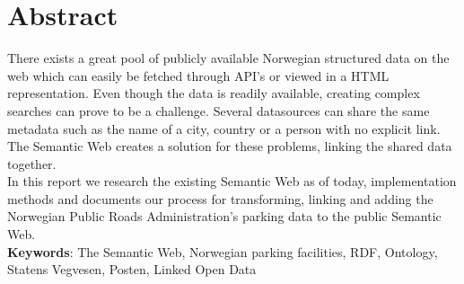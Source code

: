\chapter*{Abstract}
There exists a great pool of publicly available Norwegian structured data on the web which can easily be fetched through API's or viewed in a HTML representation. Even though the data is readily available, creating complex searches can prove to be a challenge. Several datasources can share the same metadata such as the name of a city, country or a person with no explicit link. The Semantic Web creates a solution for these problems, linking the shared data together.\\

In this report we research the existing Semantic Web as of today, implementation methods and documents our process for transforming, linking and adding the Norwegian Public Roads Administration's parking data to the public Semantic Web.\\

\textbf{Keywords}: The Semantic Web, Norwegian parking facilities, RDF, Ontology, Statens Vegvesen, Posten, Linked Open Data
